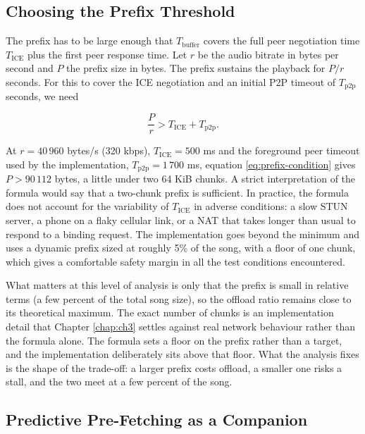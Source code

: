 \subsection{Choosing the Prefix Threshold}
\label{subsec:prefix-threshold}

\indent \par The prefix has to be large enough that $T_{\text{buffer}}$ covers the full peer negotiation time $T_{\text{ICE}}$ plus the first peer response time. Let $r$ be the audio bitrate in bytes per second and $P$ the prefix size in bytes. The prefix sustains the playback for $P / r$ seconds. For this to cover the ICE negotiation and an initial P2P timeout of $T_{\text{p2p}}$ seconds, we need

\begin{equation}
  \frac{P}{r} > T_{\text{ICE}} + T_{\text{p2p}}.
  \label{eq:prefix-condition}
\end{equation}

\par At $r = 40\,960$ bytes/s (320 kbps), $T_{\text{ICE}} = 500$ ms and the foreground peer timeout used by the implementation, $T_{\text{p2p}} = 1\,700$ ms, equation \eqref{eq:prefix-condition} gives $P > 90\,112$ bytes, a little under two 64 KiB chunks. A strict interpretation of the formula would say that a two-chunk prefix is sufficient. In practice, the formula does not account for the variability of $T_{\text{ICE}}$ in adverse conditions: a slow STUN server, a phone on a flaky cellular link, or a NAT that takes longer than usual to respond to a binding request. The implementation goes beyond the minimum and uses a dynamic prefix sized at roughly 5\% of the song, with a floor of one chunk, which gives a comfortable safety margin in all the test conditions encountered.

\par What matters at this level of analysis is only that the prefix is small in relative terms (a few percent of the total song size), so the offload ratio remains close to its theoretical maximum. The exact number of chunks is an implementation detail that Chapter \ref{chap:ch3} settles against real network behaviour rather than the formula alone. The formula sets a floor on the prefix rather than a target, and the implementation deliberately sits above that floor. What the analysis fixes is the shape of the trade-off: a larger prefix costs offload, a smaller one risks a stall, and the two meet at a few percent of the song.

\subsection{Predictive Pre-Fetching as a Companion}
\label{subsec:proactive-theory}

